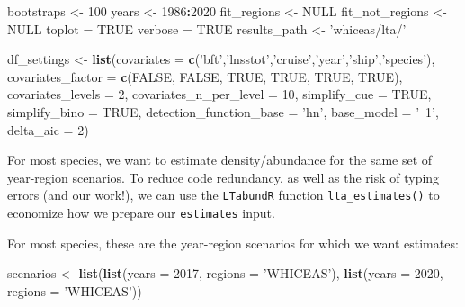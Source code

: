 \documentclass[
]{book}
\newenvironment{Shaded}{\begin{snugshade}}{\end{snugshade}}
\newcommand{\DataTypeTok}[1]{\textcolor[rgb]{0.13,0.29,0.53}{#1}}
\newcommand{\DecValTok}[1]{\textcolor[rgb]{0.00,0.00,0.81}{#1}}
\newcommand{\KeywordTok}[1]{\textcolor[rgb]{0.13,0.29,0.53}{\textbf{#1}}}
\newcommand{\NormalTok}[1]{#1}
\newcommand{\OperatorTok}[1]{\textcolor[rgb]{0.81,0.36,0.00}{\textbf{#1}}}
\newcommand{\OtherTok}[1]{\textcolor[rgb]{0.56,0.35,0.01}{#1}}
\newcommand{\StringTok}[1]{\textcolor[rgb]{0.31,0.60,0.02}{#1}}
\begin{document}
\begin{Shaded}
\begin{Highlighting}[]
\NormalTok{bootstraps <-}\StringTok{ }\DecValTok{100}
\NormalTok{years <-}\StringTok{ }\DecValTok{1986}\OperatorTok{:}\DecValTok{2020}
\NormalTok{fit_regions <-}\StringTok{ }\OtherTok{NULL}
\NormalTok{fit_not_regions <-}\StringTok{ }\OtherTok{NULL}
\NormalTok{toplot =}\StringTok{ }\OtherTok{TRUE}
\NormalTok{verbose =}\StringTok{ }\OtherTok{TRUE}
\NormalTok{results_path <-}\StringTok{ 'whiceas/lta/'}

\NormalTok{df_settings <-}
\StringTok{  }\KeywordTok{list}\NormalTok{(}\DataTypeTok{covariates =} \KeywordTok{c}\NormalTok{(}\StringTok{'bft'}\NormalTok{,}\StringTok{'lnsstot'}\NormalTok{,}\StringTok{'cruise'}\NormalTok{,}\StringTok{'year'}\NormalTok{,}\StringTok{'ship'}\NormalTok{,}\StringTok{'species'}\NormalTok{),}
       \DataTypeTok{covariates_factor =} \KeywordTok{c}\NormalTok{(}\OtherTok{FALSE}\NormalTok{, }\OtherTok{FALSE}\NormalTok{, }\OtherTok{TRUE}\NormalTok{, }\OtherTok{TRUE}\NormalTok{, }\OtherTok{TRUE}\NormalTok{, }\OtherTok{TRUE}\NormalTok{),}
       \DataTypeTok{covariates_levels =} \DecValTok{2}\NormalTok{,}
       \DataTypeTok{covariates_n_per_level =} \DecValTok{10}\NormalTok{,}
       \DataTypeTok{simplify_cue =} \OtherTok{TRUE}\NormalTok{,}
       \DataTypeTok{simplify_bino =} \OtherTok{TRUE}\NormalTok{,}
       \DataTypeTok{detection_function_base =} \StringTok{'hn'}\NormalTok{,}
       \DataTypeTok{base_model =} \StringTok{'~1'}\NormalTok{,}
       \DataTypeTok{delta_aic =} \DecValTok{2}\NormalTok{)}
\end{Highlighting}
\end{Shaded}

For most species, we want to estimate density/abundance for the same set of year-region scenarios. To reduce code redundancy, as well as the risk of typing errors (and our work!), we can use the \texttt{LTabundR} function \texttt{lta\_estimates()} to economize how we prepare our \texttt{estimates} input.

For most species, these are the year-region scenarios for which we want estimates:

\begin{Shaded}
\begin{Highlighting}[]
\NormalTok{scenarios <-}\StringTok{ }\KeywordTok{list}\NormalTok{(}\KeywordTok{list}\NormalTok{(}\DataTypeTok{years =} \DecValTok{2017}\NormalTok{,}
                       \DataTypeTok{regions =} \StringTok{'WHICEAS'}\NormalTok{),}
                  \KeywordTok{list}\NormalTok{(}\DataTypeTok{years =} \DecValTok{2020}\NormalTok{, }
                       \DataTypeTok{regions =} \StringTok{'WHICEAS'}\NormalTok{))}
\end{Highlighting}
\end{Shaded}
\end{document}
